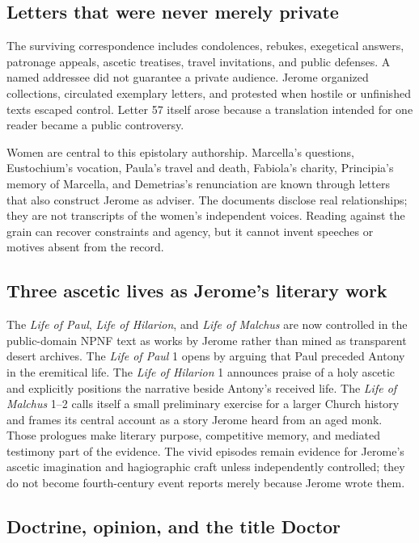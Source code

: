 \subsection{Letters that were never merely private}

The surviving correspondence includes condolences, rebukes, exegetical
answers, patronage appeals, ascetic treatises, travel invitations, and public
defenses. A named addressee did not guarantee a private audience. Jerome
organized collections, circulated exemplary letters, and protested when
hostile or unfinished texts escaped control. Letter 57 itself arose because a
translation intended for one reader became a public controversy.

Women are central to this epistolary authorship. Marcella's questions,
Eustochium's vocation, Paula's travel and death, Fabiola's charity, Principia's
memory of Marcella, and Demetrias's renunciation are known through letters that
also construct Jerome as adviser. The documents disclose real relationships;
they are not transcripts of the women's independent voices. Reading against
the grain can recover constraints and agency, but it cannot invent speeches or
motives absent from the record.

\subsection{Three ascetic lives as Jerome's literary work}

The \emph{Life of Paul}, \emph{Life of Hilarion}, and \emph{Life of Malchus}
are now controlled in the public-domain NPNF text as works by Jerome rather
than mined as transparent desert archives. The \emph{Life of Paul} 1 opens by
arguing that Paul preceded Antony in the eremitical life. The \emph{Life of
Hilarion} 1 announces praise of a holy ascetic and explicitly positions the
narrative beside Antony's received life. The \emph{Life of Malchus} 1--2 calls
itself a small preliminary exercise for a larger Church history and frames its
central account as a story Jerome heard from an aged monk. Those prologues make
literary purpose, competitive memory, and mediated testimony part of the
evidence. The vivid episodes remain evidence for Jerome's ascetic imagination
and hagiographic craft unless independently controlled; they do not become
fourth-century event reports merely because Jerome wrote them.

\subsection{Doctrine, opinion, and the title Doctor}

